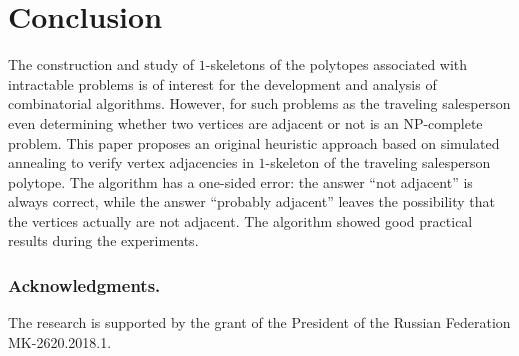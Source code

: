 \documentclass[runningheads]{llncs}
\begin{document}
\section{Conclusion} 

The construction and study of $1$-skeletons of the polytopes associated with intractable problems is of interest for the development and analysis of combinatorial algorithms.
However, for such problems as the traveling salesperson even determining whether two vertices are adjacent or not is an NP-complete problem.
This paper proposes an original heuristic approach based on simulated annealing to verify vertex adjacencies in $1$-skeleton of the traveling salesperson polytope.
The algorithm has a one-sided error: the answer ``not adjacent'' is always correct, while the answer ``probably adjacent'' leaves the possibility that the vertices actually are not adjacent.
The algorithm showed good practical results during the experiments.


\subsubsection*{Acknowledgments.}%
The research is supported by the grant of the President of the Russian Federation MK-2620.2018.1. %

%
%
% 
% 
%
\end{document}
